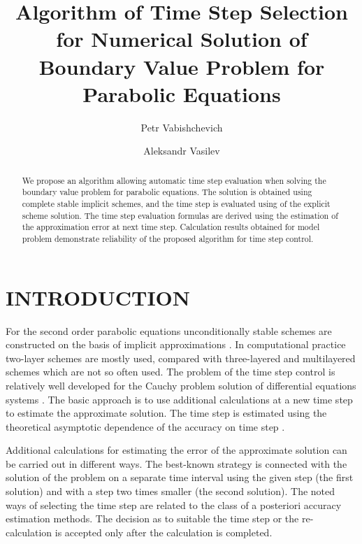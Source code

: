 \documentclass{aip-cp}
\begin{document}
\title{Algorithm of Time Step Selection for Numerical Solution of Boundary Value Problem for Parabolic  Equations}


\author[aff1,aff2]{Petr Vabishchevich}
\author[aff1,aff2]{Aleksandr Vasilev}


\maketitle


\begin{abstract}
We propose an algorithm allowing automatic time step evaluation when solving
the boundary value problem for parabolic equations.
The solution is obtained using complete stable implicit schemes, and the time step is evaluated using of the explicit scheme solution.
The time step evaluation formulas are derived using the estimation of the approximation error at next time step.
Calculation results obtained for model problem demonstrate reliability of the proposed algorithm for time step control. 
\end{abstract}

\section{INTRODUCTION}
For the second order parabolic equations unconditionally stable schemes are constructed on the basis of implicit approximations \cite{Matus}.
In computational practice two-layer schemes are mostly used, compared with three-layered and multilayered schemes which are not so often used.
The problem of the time step control is relatively well developed for the Cauchy problem solution of differential equations systems \cite{Ascher}. 
The basic approach is to use additional calculations at a new time step to estimate the approximate solution.
The time step is estimated using the theoretical asymptotic dependence of the accuracy on time step \cite{Vabishchevich}.

Additional calculations for estimating the error of the approximate solution can be carried out in different ways. The best-known strategy is connected with the solution of the problem on a separate time interval using the given step (the first solution) and with a step two times smaller (the second solution). The noted ways of selecting the time step are related to the class of a posteriori accuracy estimation methods.
The decision as to suitable the time step or the re-calculation is accepted only after the calculation is completed.
\end{document}
